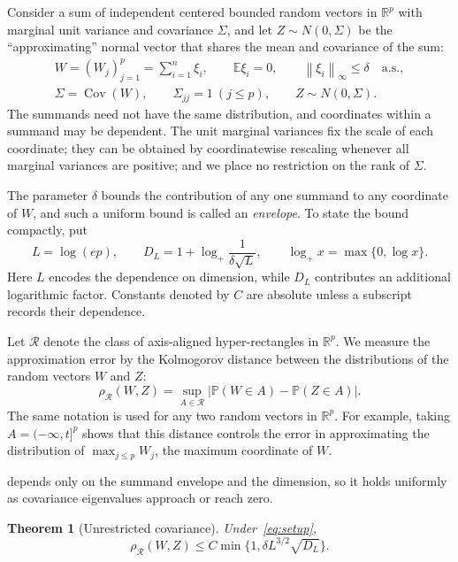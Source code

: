 \documentclass[11pt,letterpaper]{article}
\newif\ifshowrev
\newcommand{\rev}[1]{\ifshowrev{\color{revblue}%
\hypersetup{linkcolor=revblue,citecolor=revblue,urlcolor=revblue}#1}\else#1\fi}
\newif\ifshownat
\newcommand{\nat}[1]{\ifshownat{\color{revblue}%
\hypersetup{linkcolor=revblue,citecolor=revblue,urlcolor=revblue}#1}\else#1\fi}
\newif\ifshowintro
\newcommand{\itx}[1]{\ifshowintro{\color{revblue}%
\hypersetup{linkcolor=revblue,citecolor=revblue,urlcolor=revblue}#1}\else#1\fi}
\newcommand{\its}[1]{\ifshowintro{\color{revblue}#1}\else#1\fi}
\newenvironment{introblock}{\ifshowintro\color{revblue}%
\hypersetup{linkcolor=revblue,citecolor=revblue,urlcolor=revblue}\fi\indent}{}
\newtheorem{theorem}{Theorem}
\theoremstyle{remark}
\newcommand{\E}{\mathbb E}
\newcommand{\Pp}{\mathbb P}
\newcommand{\R}{\mathbb R}
\newcommand{\Cov}{\operatorname{Cov}}
\newcommand{\norm}[1]{\left\lVert#1\right\rVert}
\newcommand{\rh}{\rho_{\mathcal R}}
\begin{document}
Consider a sum of independent centered \itx{bounded} random vectors in
\(\R^p\)\itx{ with marginal unit variance and covariance \(\Sigma\), and let
\(Z\sim N(0,\Sigma)\) be the ``approximating'' normal vector that shares the
mean and covariance of the sum:}
\begin{equation}
 \begin{gathered}
 W=\its{(W_j)_{j=1}^p=}\sum_{i=1}^n\xi_i,\qquad
 \E\xi_i=0,\qquad \norm{\xi_i}_\infty\le\delta\quad\text{a.s.},\\
 \Sigma=\Cov(W),\qquad\Sigma_{jj}=1\ (j\le p),
 \qquad Z\sim N(0,\Sigma).
 \end{gathered}
 \label{eq:setup}
\end{equation}
The summands need not have the same distribution, and coordinates within
a summand may be dependent. \rev{The unit marginal variances fix the scale
of each coordinate; they can be obtained by coordinatewise rescaling
whenever all marginal variances are positive\itx{; and we place} no
restriction on the rank of \(\Sigma\).}

The parameter \(\delta\) bounds the contribution of any one summand
to any coordinate of \(W\)\itx{, and such a uniform bound is called an
\emph{envelope}}. To state the
bound compactly, put
\[
 L=\log(ep),\qquad
 D_L=1+\log_+\frac1{\delta\sqrt L},\qquad
 \log_+x=\max\{0,\log x\}.
\]
Here \(L\) \itx{encodes} the dependence on dimension, while \(D_L\)
contributes an additional logarithmic factor. Constants denoted by
\(C\) are absolute unless a subscript records their dependence.

\begin{introblock}
Let \(\mathcal R\) denote the class of axis-aligned hyper-rectangles in
\(\R^p\). We measure the approximation error by the Kolmogorov distance
between the distributions of the random vectors \(W\) and \(Z\):
\[
 \rh(W,Z)=\sup_{A\in\mathcal R}
       |\Pp(W\in A)-\Pp(Z\in A)|.
\]
The same notation is used for any two random vectors in \(\R^p\). For
example, taking \(A=(-\infty,t]^p\) shows that this distance controls the
error in approximating the distribution of \(\max_{j\le p}W_j\), the maximum
coordinate of \(W\).
\end{introblock}

\rev{ depends only on the summand envelope and the
dimension, so it holds uniformly as covariance eigenvalues approach or
reach zero.}

\begin{theorem}[Unrestricted covariance]\label{thm:unrestricted}
Under~\eqref{eq:setup},
\begin{equation}
 \rh(W,Z)\le C\min\{1,\delta L^{3/2}\sqrt{D_L}\}.
 \label{eq:unrestricted}
\end{equation}
\end{theorem}
\end{document}
